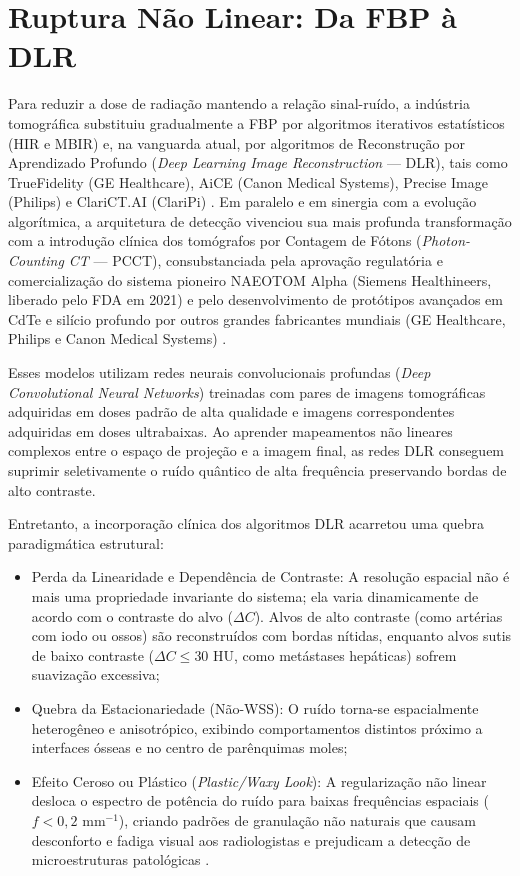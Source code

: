 \documentclass[
  12pt,
  a4paper,
  oneside
]{report}
\begin{document}
\section{Ruptura Não Linear: Da FBP à DLR}
\label{sec:ruptura_nao_linear_intro}

Para reduzir a dose de radiação mantendo a relação sinal-ruído, a indústria tomográfica substituiu gradualmente a FBP por algoritmos iterativos estatísticos (HIR e MBIR) e, na vanguarda atual, por algoritmos de Reconstrução por Aprendizado Profundo (\emph{Deep Learning Image Reconstruction} --- DLR), tais como TrueFidelity (GE Healthcare), AiCE (Canon Medical Systems), Precise Image (Philips) e ClariCT.AI (ClariPi) \cite{racine2020, debbiche2024, greffier2026}. Em paralelo e em sinergia com a evolução algorítmica, a arquitetura de detecção vivenciou sua mais profunda transformação com a introdução clínica dos tomógrafos por Contagem de Fótons (\emph{Photon-Counting CT} --- PCCT), consubstanciada pela aprovação regulatória e comercialização do sistema pioneiro NAEOTOM Alpha (Siemens Healthineers, liberado pelo FDA em 2021) e pelo desenvolvimento de protótipos avançados em CdTe e silício profundo por outros grandes fabricantes mundiais (GE Healthcare, Philips e Canon Medical Systems) \cite{willemink2018, rajendran2021, pimenta2026}.

Esses modelos utilizam redes neurais convolucionais profundas (\emph{Deep Convolutional Neural Networks}) treinadas com pares de imagens tomográficas adquiridas em doses padrão de alta qualidade e imagens correspondentes adquiridas em doses ultrabaixas. Ao aprender mapeamentos não lineares complexos entre o espaço de projeção e a imagem final, as redes DLR conseguem suprimir seletivamente o ruído quântico de alta frequência preservando bordas de alto contraste.

Entretanto, a incorporação clínica dos algoritmos DLR acarretou uma quebra paradigmática estrutural:
\begin{itemize}
  \item Perda da Linearidade e Dependência de Contraste: A resolução espacial não é mais uma propriedade invariante do sistema; ela varia dinamicamente de acordo com o contraste do alvo ($\Delta C$). Alvos de alto contraste (como artérias com iodo ou ossos) são reconstruídos com bordas nítidas, enquanto alvos sutis de baixo contraste ($\Delta C \le 30\text{ HU}$, como metástases hepáticas) sofrem suavização excessiva;
  \item Quebra da Estacionariedade (Não-WSS): O ruído torna-se espacialmente heterogêneo e anisotrópico, exibindo comportamentos distintos próximo a interfaces ósseas e no centro de parênquimas moles;
  \item Efeito Ceroso ou Plástico (\emph{Plastic/Waxy Look}): A regularização não linear desloca o espectro de potência do ruído para baixas frequências espaciais ($f < 0{,}2\text{ mm}^{-1}$), criando padrões de granulação não naturais que causam desconforto e fadiga visual aos radiologistas e prejudicam a detecção de microestruturas patológicas \cite{toia2023, solomon2020}.
\end{itemize}
\end{document}
